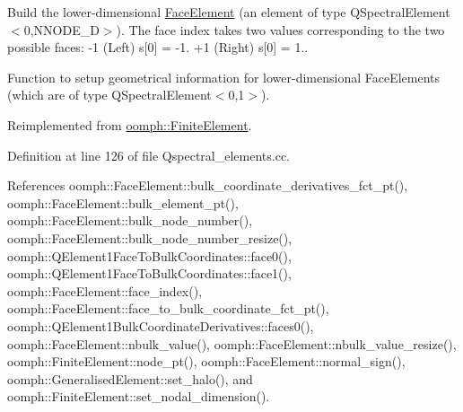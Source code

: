 Build the lower-\/dimensional \hyperlink{classoomph_1_1FaceElement}{Face\+Element} (an element of type Q\+Spectral\+Element$<$0,\+N\+N\+O\+D\+E\+\_\+D$>$). The face index takes two values corresponding to the two possible faces\+: -\/1 (Left) s\mbox{[}0\mbox{]} = -\/1. +1 (Right) s\mbox{[}0\mbox{]} = 1.. 

Function to setup geometrical information for lower-\/dimensional Face\+Elements (which are of type Q\+Spectral\+Element$<$0,1$>$). 

Reimplemented from \hyperlink{classoomph_1_1FiniteElement_aaf7bead5b462cfd5401d97b3dbdc7af7}{oomph\+::\+Finite\+Element}.



Definition at line 126 of file Qspectral\+\_\+elements.\+cc.



References oomph\+::\+Face\+Element\+::bulk\+\_\+coordinate\+\_\+derivatives\+\_\+fct\+\_\+pt(), oomph\+::\+Face\+Element\+::bulk\+\_\+element\+\_\+pt(), oomph\+::\+Face\+Element\+::bulk\+\_\+node\+\_\+number(), oomph\+::\+Face\+Element\+::bulk\+\_\+node\+\_\+number\+\_\+resize(), oomph\+::\+Q\+Element1\+Face\+To\+Bulk\+Coordinates\+::face0(), oomph\+::\+Q\+Element1\+Face\+To\+Bulk\+Coordinates\+::face1(), oomph\+::\+Face\+Element\+::face\+\_\+index(), oomph\+::\+Face\+Element\+::face\+\_\+to\+\_\+bulk\+\_\+coordinate\+\_\+fct\+\_\+pt(), oomph\+::\+Q\+Element1\+Bulk\+Coordinate\+Derivatives\+::faces0(), oomph\+::\+Face\+Element\+::nbulk\+\_\+value(), oomph\+::\+Face\+Element\+::nbulk\+\_\+value\+\_\+resize(), oomph\+::\+Finite\+Element\+::node\+\_\+pt(), oomph\+::\+Face\+Element\+::normal\+\_\+sign(), oomph\+::\+Generalised\+Element\+::set\+\_\+halo(), and oomph\+::\+Finite\+Element\+::set\+\_\+nodal\+\_\+dimension().

\mbox{\label{classoomph_1_1QSpectralElement_3_011_00_01NNODE__1D_01_4_a1d7445c2348d96ac5349023edb150fe5}} 

